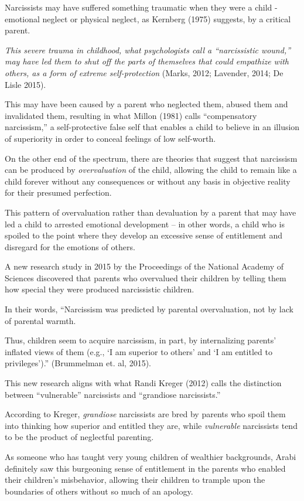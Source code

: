 \documentclass[oneside]{book}
\numberwithin{equation}{section}
\begin{document}
%
Narcissists may have suffered something traumatic when they were a child - emotional neglect or physical neglect, as Kernberg (1975) suggests, by a critical parent.

\textit{This severe trauma in childhood, what psychologists call a ``narcissistic wound,'' may have led them to shut off the parts of themselves that could empathize with others, as a form of extreme self-protection} (Marks, 2012; Lavender, 2014; De Lisle 2015).

This may have been caused by a parent who neglected them, abused them and invalidated them, resulting in what Millon (1981) calls ``compensatory narcissism,'' a self-protective false self that enables a child to believe in an illusion of superiority in order to conceal feelings of low self-worth.

%
On the other end of the spectrum, there are theories that suggest that narcissism can be produced by \textit{overvaluation} of the child, allowing the child to remain like a child forever without any consequences or without any basis in objective reality for their presumed perfection.

This pattern of overvaluation rather than devaluation by a parent that may have led a child to arrested emotional development -- in other words, a child who is spoiled to the point where they develop an excessive sense of entitlement and disregard for the emotions of others.

%
A new research study in 2015 by the Proceedings of the National Academy of Sciences discovered that parents who overvalued their children by telling them how special they were produced narcissistic children.

In their words, ``Narcissism was predicted by parental overvaluation, not by lack of parental warmth.

Thus, children seem to acquire narcissism, in part, by internalizing parents' inflated views of them (e.g., `I am superior to others' and `I am entitled to privileges').'' (Brummelman et. al, 2015).

%
This new research aligns with what Randi Kreger (2012) calls the distinction between ``vulnerable'' narcissists and ``grandiose narcissists.''

According to Kreger, \textit{grandiose} narcissists are bred by parents who spoil them into thinking how superior and entitled they are, while \textit{vulnerable} narcissists tend to be the product of neglectful parenting.

%
As someone who has taught very young children of wealthier backgrounds, Arabi definitely saw this burgeoning sense of entitlement in the parents who enabled their children's misbehavior, allowing their children to trample upon the boundaries of others without so much of an apology.
\end{document}
